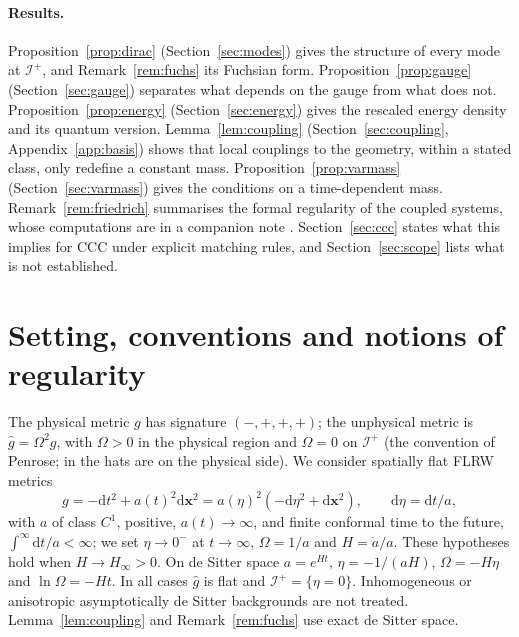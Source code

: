 \documentclass[11pt,a4paper]{article}
\theoremstyle{definition}
\newcommand{\scri}{\mathscr{I}^{+}}
\newcommand{\dd}{\mathrm{d}}
\newcommand{\hg}{\hat g}
\begin{document}
\paragraph{Results.} Proposition~\ref{prop:dirac} (Section~\ref{sec:modes}) gives the structure of every mode at $\scri$, and Remark~\ref{rem:fuchs} its Fuchsian form. Proposition~\ref{prop:gauge} (Section~\ref{sec:gauge}) separates what depends on the gauge from what does not. Proposition~\ref{prop:energy} (Section~\ref{sec:energy}) gives the rescaled energy density and its quantum version. Lemma~\ref{lem:coupling} (Section~\ref{sec:coupling}, Appendix~\ref{app:basis}) shows that local couplings to the geometry, within a stated class, only redefine a constant mass. Proposition~\ref{prop:varmass} (Section~\ref{sec:varmass}) gives the conditions on a time-dependent mass. Remark~\ref{rem:friedrich} summarises the formal regularity of the coupled systems, whose computations are in a companion note \cite{Companion}. Section~\ref{sec:ccc} states what this implies for CCC under explicit matching rules, and Section~\ref{sec:scope} lists what is not established.

\section{Setting, conventions and notions of regularity}
\label{sec:setting}

The physical metric $g$ has signature $(-,+,+,+)$; the unphysical metric is $\hg=\Omega^{2}g$, with $\Omega>0$ in the physical region and $\Omega=0$ on $\scri$ (the convention of Penrose; in \cite{Friedrich2015,Friedrich2017} the hats are on the physical side). We consider spatially flat FLRW metrics
\begin{equation}
g=-\dd t^{2}+a(t)^{2}\dd\mathbf{x}^{2}=a(\eta)^{2}(-\dd\eta^{2}+\dd\mathbf{x}^{2}),\qquad \dd\eta=\dd t/a,
\end{equation}
with $a$ of class $C^{1}$, positive, $a(t)\to\infty$, and finite conformal time to the future, $\int^{\infty}\dd t/a<\infty$; we set $\eta\to0^{-}$ at $t\to\infty$, $\Omega=1/a$ and $H=\dot a/a$. These hypotheses hold when $H\to H_{\infty}>0$. On de Sitter space $a=e^{Ht}$, $\eta=-1/(aH)$, $\Omega=-H\eta$ and $\ln\Omega=-Ht$. In all cases $\hg$ is flat and $\scri=\{\eta=0\}$. Inhomogeneous or anisotropic asymptotically de Sitter backgrounds are not treated. Lemma~\ref{lem:coupling} and Remark~\ref{rem:fuchs} use exact de Sitter space.
\end{document}
